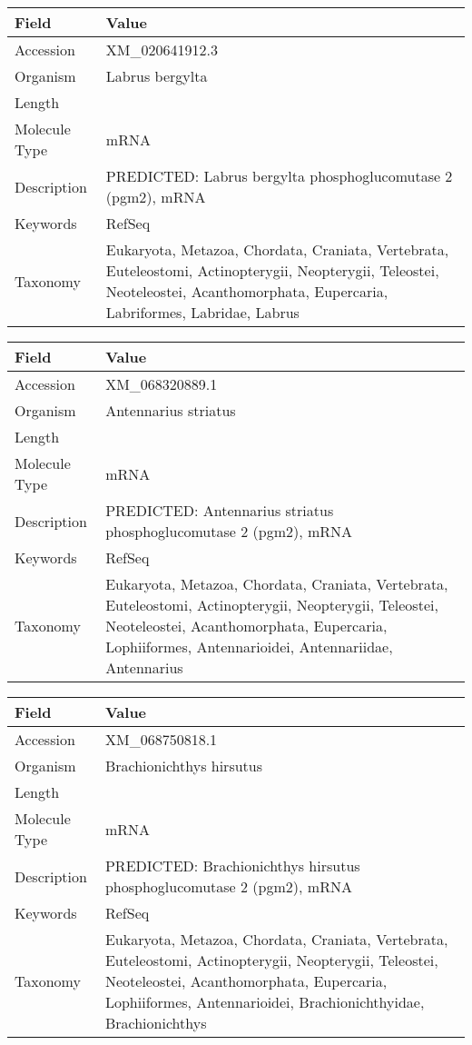 \documentclass[10pt]{article}
\begin{document}
\vspace{1em}
{\footnotesize
\begin{longtable}{>{\raggedright\arraybackslash}p{4.5cm} >{\raggedright\arraybackslash}p{11.5cm}}
\textbf{Field} & \textbf{Value} \\
\hline
Accession & XM\_020641912.3 \\
Organism & Labrus bergylta \\
Length & 2924 \\
Molecule Type & mRNA \\
Description & PREDICTED: Labrus bergylta phosphoglucomutase 2 (pgm2), mRNA \\
Keywords & RefSeq \\
Taxonomy & Eukaryota, Metazoa, Chordata, Craniata, Vertebrata, Euteleostomi, Actinopterygii, Neopterygii, Teleostei, Neoteleostei, Acanthomorphata, Eupercaria, Labriformes, Labridae, Labrus \\
\end{longtable}
}

\vspace{1em}
{\footnotesize
\begin{longtable}{>{\raggedright\arraybackslash}p{4.5cm} >{\raggedright\arraybackslash}p{11.5cm}}
\textbf{Field} & \textbf{Value} \\
\hline
Accession & XM\_068320889.1 \\
Organism & Antennarius striatus \\
Length & 2801 \\
Molecule Type & mRNA \\
Description & PREDICTED: Antennarius striatus phosphoglucomutase 2 (pgm2), mRNA \\
Keywords & RefSeq \\
Taxonomy & Eukaryota, Metazoa, Chordata, Craniata, Vertebrata, Euteleostomi, Actinopterygii, Neopterygii, Teleostei, Neoteleostei, Acanthomorphata, Eupercaria, Lophiiformes, Antennarioidei, Antennariidae, Antennarius \\
\end{longtable}
}

\vspace{1em}
{\footnotesize
\begin{longtable}{>{\raggedright\arraybackslash}p{4.5cm} >{\raggedright\arraybackslash}p{11.5cm}}
\textbf{Field} & \textbf{Value} \\
\hline
Accession & XM\_068750818.1 \\
Organism & Brachionichthys hirsutus \\
Length & 2618 \\
Molecule Type & mRNA \\
Description & PREDICTED: Brachionichthys hirsutus phosphoglucomutase 2 (pgm2), mRNA \\
Keywords & RefSeq \\
Taxonomy & Eukaryota, Metazoa, Chordata, Craniata, Vertebrata, Euteleostomi, Actinopterygii, Neopterygii, Teleostei, Neoteleostei, Acanthomorphata, Eupercaria, Lophiiformes, Antennarioidei, Brachionichthyidae, Brachionichthys \\
\end{longtable}
}
\end{document}

